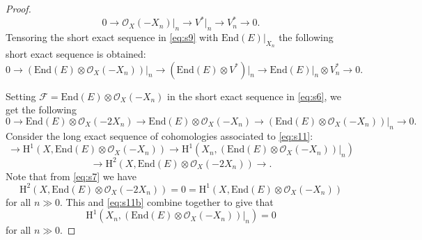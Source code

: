 \documentclass[12pt,reqno]{amsart}
\numberwithin{equation}{section}
\theoremstyle{definition}
\begin{document}
\begin{proof}
\begin{equation}
\label{eq:s9}
0  \longrightarrow  \mathcal{O}_X(-X_n)\big\vert_n  \longrightarrow  V^*\big\vert_n
\longrightarrow  V^*_n  \longrightarrow   0. 
\end{equation}
Tensoring the short exact sequence in \eqref{eq:s9} with $\mathrm{End} (E)\big\vert_{X_n}$ the following
short exact sequence is obtained:
\begin{equation}
\label{eq:s10}
0 \longrightarrow  \left( \mathrm{End} (E) \otimes \mathcal{O}_X(-X_n) \right)\big\vert_n
 \longrightarrow  \left( \mathrm{End} (E) \otimes V^* \right)\big\vert_n  \longrightarrow  
\mathrm{End} (E)\big\vert_n \otimes V^*_n  \longrightarrow  0.
\end{equation}

Setting $\mathcal{F}  =  \mathrm{End} (E) \otimes \mathcal{O}_X(-X_n) $ in the short exact sequence in
\eqref{eq:s6}, we get the following
\begin{equation}\label{eq:s11}
0  \longrightarrow  \mathrm{End} (E)\otimes \mathcal{O}_X(-2 X_n)   \longrightarrow  \mathrm{End} (E)\otimes
\mathcal{O}_X(-X_n)   \longrightarrow  \left( \mathrm{End} (E) \otimes \mathcal{O}_X(-X_n) \right)\big\vert_n
\longrightarrow  0.
\end{equation}
Consider the long exact sequence of cohomologies associated to \eqref{eq:s11}:
\begin{equation*}
\longrightarrow  \mathrm{H}^1\left(X,  \mathrm{End} (E)\otimes \mathcal{O}_X(- X_n) \right)   \longrightarrow 
\mathrm{H}^1\left(X_n,  \left( \mathrm{End} (E) \otimes \mathcal{O}_X(-X_n) \right)\big\vert_n \right)
 \end{equation*}
\begin{equation}\label{eq:s11b}
\longrightarrow \mathrm{H}^2\left(X,  \mathrm{End} (E)\otimes \mathcal{O}_X(-2 X_n) \right) 
\longrightarrow.
\end{equation}
Note that from \eqref{eq:s7} we have 
\begin{equation}
\label{eq:s12}
\mathrm{H}^2\left(X,  \mathrm{End} (E)\otimes \mathcal{O}_X(-2 X_n) \right)  =  0  =  
\mathrm{H}^1\left(X,  \mathrm{End} (E)\otimes \mathcal{O}_X(- X_n) \right)
\end{equation}
for all $n  \gg  0$. This and \eqref{eq:s11b} combine together to give that
\begin{equation}
\label{eq:s13}
\mathrm{H}^1\left(X_n,  \left( \mathrm{End} (E) \otimes \mathcal{O}_X(-X_n) \right)\big\vert_n \right)  =  0
\end{equation}
for all $n  \gg   0$.


\end{proof}
\end{document}
